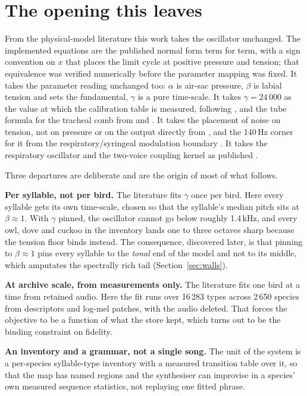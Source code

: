 \documentclass[10pt,twocolumn,a4paper]{article}
\begin{document}
\section{The opening this leaves}
\label{sec:pickup}

From the physical-model literature this work takes the oscillator unchanged. The
implemented equations are the published normal form term for term, with a sign convention
on $x$ that places the limit cycle at positive pressure and tension; that equivalence was
verified numerically before the parameter mapping was fixed. It takes the parameter
reading unchanged too: $\alpha$ is air-sac pressure, $\beta$ is labial tension and sets the
fundamental, $\gamma$ is a pure time-scale. It takes $\gamma = 24\,000$ as the value at
which the calibration table is measured, following \citet{perl2011}, and the tube formula
for the tracheal comb from \citet{nelson2005} and \citet{riede2006}. It takes the placement
of noise on tension, not on pressure or on the output directly from
\citet{amador2021}, and the 140\,Hz corner for it from the respiratory/syringeal modulation
boundary \citep{riedegoller2010}. It takes the respiratory oscillator and the two-voice
coupling kernel as published \citep{fainstein2025,laje2005}.

Three departures are deliberate and are the origin of most of what follows.

\textbf{Per syllable, not per bird.} The literature fits $\gamma$ once per bird. Here every
syllable gets its own time-scale, chosen so that the syllable's median pitch sits at
$\beta \approx 1$. With $\gamma$ pinned, the oscillator cannot go below roughly 1.4\,kHz,
and every owl, dove and cuckoo in the inventory lands one to three octaves sharp because
the tension floor binds instead. The consequence, discovered later, is that pinning to
$\beta \approx 1$ pins every syllable to the \emph{tonal} end of the model and not to
its middle, which amputates the spectrally rich tail (Section~\ref{sec:walls}).

\textbf{At archive scale, from measurements only.} The literature fits one bird at a time
from retained audio. Here the fit runs over 16\,283 types across 2\,650 species from
descriptors and log-mel patches, with the audio deleted. That forces the objective to be a
function of what the store kept, which turns out to be the binding constraint on fidelity.

\textbf{An inventory and a grammar, not a single song.} The unit of the system is a
per-species syllable-type inventory with a measured transition table over it, so that the
map has named regions and the synthesiser can improvise in a species' own measured
sequence statistics, not replaying one fitted phrase.
\end{document}
